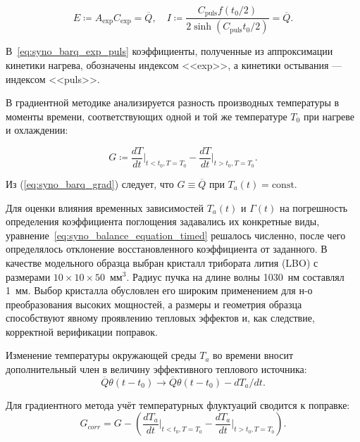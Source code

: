 \begin{equation}
	E \coloneq A_{\text{exp}}C_{\text{exp}} = \overline{Q},\quad I \coloneq \frac{C_{\text{puls}}f(t_0/2)}{2\sinh(C_{\text{puls}}t_0/2)} = \overline{Q}.
	\label{eq:syno_barq_exp_puls}
\end{equation}

В~\cref{eq:syno_barq_exp_puls} коэффициенты, полученные из аппроксимации кинетики нагрева, обозначены индексом <<exp>>, а кинетики остывания --- индексом <<puls>>.

В градиентной методике анализируется разность производных температуры в моменты времени, соответствующих одной и той же температуре \( T_0 \) при нагреве и охлаждении:


\begin{equation}
	G \coloneq \frac{d T}{d t} \bigg|_{t < t_0, T = T_0} - \frac{d T}{d t} \bigg|_{t > t_0, T = T_0}.
	\label{eq:syno_barq_grad}
\end{equation}


Из (\ref{eq:syno_barq_grad}) следует, что \( G \equiv \overline{Q} \) при $T_a(t)=\text{const}$.

Для оценки влияния временных зависимостей $T_a(t)$ и $\Gamma(t)$ на погрешность определения коэффициента поглощения задавались их конкретные виды, уравнение~\cref{eq:syno_balance_equation_timed} решалось численно, после чего определялось отклонение восстановленного коэффициента от заданного. В качестве модельного образца выбран кристалл трибората лития (LBO) с размерами $10\times10\times50$~мм$^3$. Радиус пучка на длине волны 1030~нм составлял 1~мм. Выбор кристалла обусловлен его широким применением для н-о преобразования высоких мощностей, а размеры и геометрия образца способствуют явному проявлению тепловых эффектов и, как следствие, корректной верификации поправок.

Изменение температуры окружающей среды $T_a$ во времени вносит дополнительный член в величину эффективного теплового источника:
\begin{equation}
	\overline{Q}\theta(t - t_0) \rightarrow \overline{Q}\theta(t - t_0) - d T_a/d t.
	\label{eq:syno_q_corr_ta}
\end{equation}

Для градиентного метода учёт температурных флуктуаций сводится к поправке:
\begin{equation}
	G_{corr} = G - \left(\frac{d T_a}{d t} \bigg|_{t < t_0, T = T_0} - \frac{d T_a}{dt} \bigg|_{t > t_0, T = T_0}\right).
	\label{eq:syno_g_corr_ta}
\end{equation}

